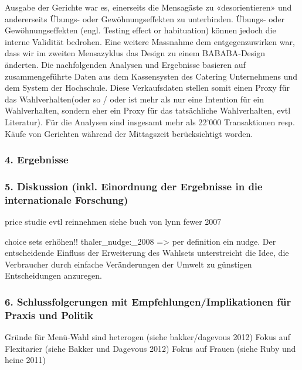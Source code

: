 \documentclass[12pt,ngerman,]{article}
\begin{document}
Ausgabe der Gerichte war es, einerseits die Mensagäste zu
«desorientieren» und andererseits Übungs- oder Gewöhnungseffekten zu
unterbinden. Übungs- oder Gewöhnungseffekten (engl. Testing effect or
habituation) können jedoch die interne Validität bedrohen. Eine weitere
Massnahme dem entgegenzuwirken war, dass wir im zweiten Mensazyklus das
Design zu einem BABABA-Design änderten. Die nachfolgenden Analysen und
Ergebnisse basieren auf zusammengeführte Daten aus dem Kassensysten des
Catering Unternehmens und dem System der Hochschule. Diese Verkaufsdaten
stellen somit einen Proxy für das Wahlverhalten(oder so / oder ist mehr
als nur eine Intention für ein Wahlverhalten, sondern eher ein Proxy für
das tatsächliche Wahlverhalten, evtl Literatur). Für die Analysen sind
insgesamt mehr als 22'000 Transaktionen resp. Käufe von Gerichten
während der Mittagszeit berücksichtigt worden.

\hypertarget{ergebnisse}{%
\subsubsection{4. Ergebnisse}\label{ergebnisse}}

\hypertarget{diskussion-inkl.-einordnung-der-ergebnisse-in-die-internationale-forschung}{%
\subsubsection{5. Diskussion (inkl. Einordnung der Ergebnisse in die
internationale
Forschung)}\label{diskussion-inkl.-einordnung-der-ergebnisse-in-die-internationale-forschung}}

price studie evtl reinnehmen siehe buch von lynn fewer 2007

choice sets erhöhen!! thaler\_nudge:\_2008 =\textgreater{} per
definition ein nudge. Der entscheidende Einfluss der Erweiterung des
Wahlsets unterstreicht die Idee, die Verbraucher durch einfache
Veränderungen der Umwelt zu günstigen Entscheidungen anzuregen.

\hypertarget{schlussfolgerungen-mit-empfehlungenimplikationen-fur-praxis-und-politik}{%
\subsubsection{6. Schlussfolgerungen mit Empfehlungen/Implikationen für
Praxis und
Politik}\label{schlussfolgerungen-mit-empfehlungenimplikationen-fur-praxis-und-politik}}

Gründe für Menü-Wahl sind heterogen (siehe bakker/dagevous 2012) Fokus
auf Flexitarier (siehe Bakker und Dagevous 2012) Fokus auf Frauen (siehe
Ruby und heine 2011)
\end{document}
